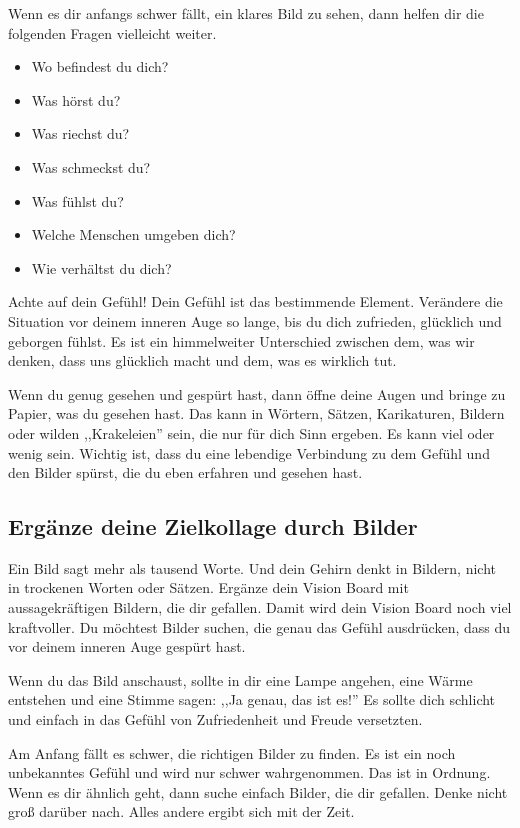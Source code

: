 \documentclass[../Lebensziel.tex]{subfiles}
\begin{document}
Wenn es dir anfangs schwer fällt, ein klares Bild zu sehen, dann helfen dir die folgenden Fragen vielleicht weiter.
\begin{multicols}{2}
    \begin{itemize}
        \item Wo befindest du dich?
        \item Was hörst du?
        \item Was riechst du?
        \item Was schmeckst du?
        \item Was fühlst du?
        \item Welche Menschen umgeben dich?
        \item Wie verhältst du dich?
    \end{itemize}
\end{multicols}

Achte auf dein Gefühl! Dein Gefühl ist das bestimmende Element. Verändere die Situation vor deinem inneren Auge so lange, bis du dich zufrieden, glücklich und geborgen fühlst. Es ist ein himmelweiter Unterschied zwischen dem, was wir denken, dass uns glücklich macht und dem, was es wirklich tut.

Wenn du genug gesehen und gespürt hast, dann öffne deine Augen und bringe zu Papier, was du gesehen hast. Das kann in Wörtern, Sätzen, Karikaturen, Bildern oder wilden ,,Krakeleien'' sein, die nur für dich Sinn ergeben. Es kann viel oder wenig sein. Wichtig ist, dass du eine lebendige Verbindung zu dem Gefühl und den Bilder spürst, die du eben erfahren und gesehen hast.

\subsection{Ergänze deine Zielkollage durch Bilder}
Ein Bild sagt mehr als tausend Worte. Und dein Gehirn denkt in Bildern, nicht in trockenen Worten oder Sätzen. Ergänze dein Vision Board mit aussagekräftigen Bildern, die dir gefallen. Damit wird dein Vision Board noch viel kraftvoller.
Du möchtest Bilder suchen, die genau das Gefühl ausdrücken, dass du vor deinem inneren Auge gespürt hast.

Wenn du das Bild anschaust, sollte in dir eine Lampe angehen, eine Wärme entstehen und eine Stimme sagen: ,,Ja genau, das ist es!''
Es sollte dich schlicht und einfach in das Gefühl von Zufriedenheit und Freude versetzten.

Am Anfang fällt es schwer, die richtigen Bilder zu finden. Es ist ein noch unbekanntes Gefühl und wird nur schwer wahrgenommen. Das ist in Ordnung. Wenn es dir ähnlich geht, dann suche einfach Bilder, die dir gefallen. Denke nicht groß darüber nach. Alles andere ergibt sich mit der Zeit.
\end{document}
